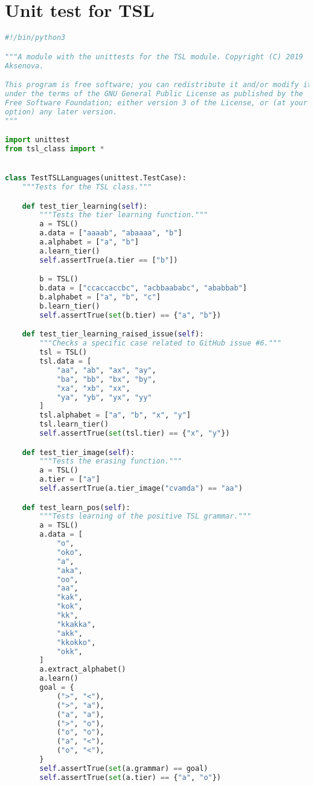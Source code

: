\section{Unit test for TSL}

\begin{lstlisting}[language=Python]
#!/bin/python3

"""A module with the unittests for the TSL module. Copyright (C) 2019  Alena
Aksenova.

This program is free software; you can redistribute it and/or modify it
under the terms of the GNU General Public License as published by the
Free Software Foundation; either version 3 of the License, or (at your
option) any later version.
"""

import unittest
from tsl_class import *


class TestTSLLanguages(unittest.TestCase):
    """Tests for the TSL class."""

    def test_tier_learning(self):
        """Tests the tier learning function."""
        a = TSL()
        a.data = ["aaaab", "abaaaa", "b"]
        a.alphabet = ["a", "b"]
        a.learn_tier()
        self.assertTrue(a.tier == ["b"])

        b = TSL()
        b.data = ["ccaccaccbc", "acbbaababc", "ababbab"]
        b.alphabet = ["a", "b", "c"]
        b.learn_tier()
        self.assertTrue(set(b.tier) == {"a", "b"})

    def test_tier_learning_raised_issue(self):
        """Checks a specific case related to GitHub issue #6."""
        tsl = TSL()
        tsl.data = [
            "aa", "ab", "ax", "ay", 
            "ba", "bb", "bx", "by", 
            "xa", "xb", "xx", 
            "ya", "yb", "yx", "yy"
        ]
        tsl.alphabet = ["a", "b", "x", "y"]
        tsl.learn_tier()
        self.assertTrue(set(tsl.tier) == {"x", "y"})

    def test_tier_image(self):
        """Tests the erasing function."""
        a = TSL()
        a.tier = ["a"]
        self.assertTrue(a.tier_image("cvamda") == "aa")

    def test_learn_pos(self):
        """Tests learning of the positive TSL grammar."""
        a = TSL()
        a.data = [
            "o",
            "oko",
            "a",
            "aka",
            "oo",
            "aa",
            "kak",
            "kok",
            "kk",
            "kkakka",
            "akk",
            "kkokko",
            "okk",
        ]
        a.extract_alphabet()
        a.learn()
        goal = {
            (">", "<"),
            (">", "a"),
            ("a", "a"),
            (">", "o"),
            ("o", "o"),
            ("a", "<"),
            ("o", "<"),
        }
        self.assertTrue(set(a.grammar) == goal)
        self.assertTrue(set(a.tier) == {"a", "o"})


\end{lstlisting}

